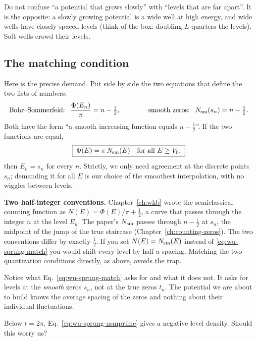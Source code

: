 \begin{pitfall}
Do not confuse ``a potential that grows slowly'' with ``levels that are far apart''. It is the opposite: a slowly growing potential is a wide well at high energy, and wide wells have closely spaced levels (think of the box: doubling $L$ quarters the levels). Soft wells crowd their levels.
\end{pitfall}

\subsection{The matching condition}

Here is the precise demand. Put side by side the two equations that define the two lists of numbers:
\[
\text{Bohr--Sommerfeld: }\ \frac{\Phi(E_n)}{\pi}=n-\tfrac12,\qquad\qquad \text{smooth zeros: }\ \Nsm(s_n)=n-\tfrac12 .
\]
Both have the form ``a smooth increasing function equals $n-\tfrac12$''. If the two functions are equal,
\begin{equation}
\boxed{\;\Phi(E)=\pi\,N_{\mathrm{sm}}(E)\quad\text{for all }E\ge V_0,\;}
\label{eq:wu-sprung-match}
\end{equation}
then $E_n=s_n$ for every $n$. Strictly, we only need agreement at the discrete points $s_n$; demanding it for all $E$ is our choice of the smoothest interpolation, with no wiggles between levels.

\begin{pitfall}
\textbf{Two half-integer conventions.} Chapter~\ref{ch:wkb} wrote the semiclassical counting function as $N(E)=\Phi(E)/\pi+\tfrac12$, a curve that passes through the integer $n$ at the level $E_n$. The paper's $N_{\mathrm{sm}}$ passes through $n-\tfrac12$ at $s_n$, the midpoint of the jump of the true staircase (Chapter~\ref{ch:counting-zeros}). The two conventions differ by exactly $\tfrac12$. If you set $N(E)=N_{\mathrm{sm}}(E)$ instead of \eqref{eq:wu-sprung-match} you would shift every level by half a spacing. Matching the two quantization conditions directly, as above, avoids the trap.
\end{pitfall}

Notice what Eq.~\eqref{eq:wu-sprung-match} asks for and what it does not. It asks for levels at the \emph{smooth} zeros $s_n$, not at the true zeros $t_n$. The potential we are about to build knows the average spacing of the zeros and nothing about their individual fluctuations.

\begin{checkpoint}
Below $t=2\pi$, Eq.~\eqref{eq:wu-sprung-nsmprime} gives a negative level density. Should this worry us?
\end{checkpoint}

